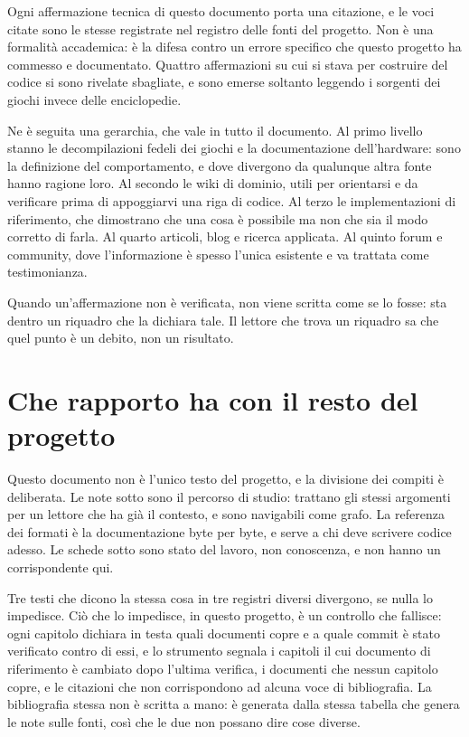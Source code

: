 Ogni affermazione tecnica di questo documento porta una citazione, e le voci citate sono
le stesse registrate nel registro delle fonti del progetto. Non è una formalità
accademica: è la difesa contro un errore specifico che questo progetto ha commesso e
documentato. Quattro affermazioni su cui si stava per costruire del codice si sono
rivelate sbagliate, e sono emerse soltanto leggendo i sorgenti dei giochi invece delle
enciclopedie.

Ne è seguita una gerarchia, che vale in tutto il documento. Al primo livello stanno le
decompilazioni fedeli dei giochi e la documentazione dell'hardware: sono la definizione
del comportamento, e dove divergono da qualunque altra fonte hanno ragione loro. Al
secondo le wiki di dominio, utili per orientarsi e da verificare prima di appoggiarvi
una riga di codice. Al terzo le implementazioni di riferimento, che dimostrano che una
cosa è possibile ma non che sia il modo corretto di farla. Al quarto articoli, blog e
ricerca applicata. Al quinto forum e community, dove l'informazione è spesso l'unica
esistente e va trattata come testimonianza.

Quando un'affermazione non è verificata, non viene scritta come se lo fosse: sta dentro
un riquadro che la dichiara tale. Il lettore che trova un riquadro sa che quel punto è
un debito, non un risultato.

\section*{Che rapporto ha con il resto del progetto}

Questo documento non è l'unico testo del progetto, e la divisione dei compiti è
deliberata. Le note sotto  sono il percorso di studio: trattano gli stessi
argomenti per un lettore che ha già il contesto, e sono navigabili come grafo. La
referenza dei formati è la documentazione byte per byte, e serve a chi deve scrivere
codice adesso. Le schede sotto  sono stato del lavoro, non conoscenza, e
non hanno un corrispondente qui.

Tre testi che dicono la stessa cosa in tre registri diversi divergono, se nulla lo
impedisce. Ciò che lo impedisce, in questo progetto, è un controllo che fallisce: ogni
capitolo dichiara in testa quali documenti copre e a quale commit è stato verificato
contro di essi, e lo strumento  segnala i capitoli
il cui documento di riferimento è cambiato dopo l'ultima verifica, i documenti che
nessun capitolo copre, e le citazioni che non corrispondono ad alcuna voce di
bibliografia. La bibliografia stessa non è scritta a mano: è generata dalla stessa
tabella che genera le note sulle fonti, così che le due non possano dire cose diverse.

